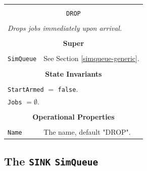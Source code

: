 \documentclass[12pt]{book}
\begin{document}
\begin{tabular}{|l|l|l|}
\hline
\multicolumn{3}{|c|}{} \\
\multicolumn{3}{|c|}{\lstinline[basicstyle=\large]{DROP}} \\
\multicolumn{3}{|c|}{} \\
\hline
\multicolumn{3}{|l|}{\em Drops jobs immediately upon arrival.} \\
\hline
\multicolumn{3}{|c|}{} \\
\multicolumn{3}{|c|}{\bf Super} \\
\multicolumn{3}{|c|}{} \\
\hline
\lstinline|SimQueue| & \multicolumn{2}{|l|}{See Section \ref{simqueue-generic}.} \\
\hline
\multicolumn{3}{|c|}{} \\
\multicolumn{3}{|c|}{\bf State  Invariants} \\
\multicolumn{3}{|c|}{} \\
\hline
\multicolumn{3}{|l|}{\lstinline|StartArmed| $=$ \lstinline|false|.} \\
\multicolumn{3}{|l|}{\lstinline|Jobs| $= \emptyset$.} \\
\hline
\multicolumn{3}{|c|}{} \\
\multicolumn{3}{|c|}{\bf Operational Properties} \\
\multicolumn{3}{|c|}{} \\
\hline
\lstinline|Name|      & \multicolumn{2}{|l|}{The name, default "DROP".} \\
\hline
\end{tabular}

\subsection{The \lstinline{SINK} \lstinline{SimQueue}}
\end{document}
